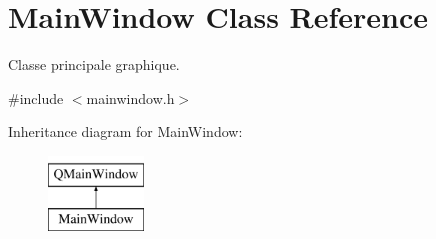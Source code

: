 \hypertarget{class_main_window}{}\section{Main\+Window Class Reference}
\label{class_main_window}


Classe principale graphique.  




{\ttfamily \#include $<$mainwindow.\+h$>$}

Inheritance diagram for Main\+Window\+:\begin{figure}[H]
\begin{center}
\leavevmode
\includegraphics[height=2.000000cm]{class_main_window}
\end{center}
\end{figure}
